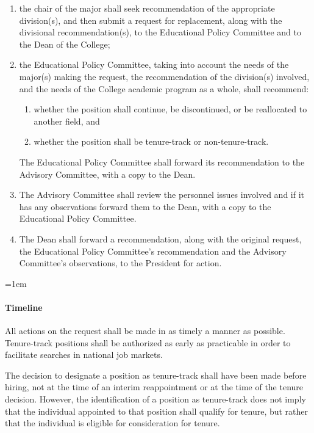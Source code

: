 \documentclass{manual}
\let\oldparagraph\paragraph
\renewcommand\paragraph{\leftskip=1em\oldparagraph}
\newcommand{\itemLevelA}{\alph*.}
\newcommand{\itemLevelB}{\arabic*)}
\newcommand{\itemRefA}{\alph*}
\newcommand{\itemRefB}{\arabic*}
\begin{document}
\begin{enumerate}[label=\itemLevelA,ref=\itemRefA]
\item  the chair of the major shall seek recommendation of the appropriate division(s), and then submit a request for replacement, along with the divisional recommendation(s), to the Educational Policy Committee and to the Dean of the College;

\item  the Educational Policy Committee, taking into account the needs of the major(s) making the request, the recommendation of the division(s) involved, and the needs of the College academic program as a whole, shall recommend:
\begin{enumerate}[label=\itemLevelB,ref=\itemRefB]

\item whether the position shall continue, be discontinued, or be reallocated to another field, and

\item whether the position shall be tenure-track or non-tenure-track.
\end{enumerate}
The Educational Policy Committee shall forward its recommendation to the Advisory Committee, with a copy to the Dean.

\item The Advisory Committee shall review the personnel issues involved and if it has any observations forward them to the Dean, with a copy to the Educational Policy Committee.

\item The Dean shall forward a recommendation, along with the original request, the Educational Policy Committee's recommendation and the Advisory Committee's observations, to the President for action.
\end{enumerate}

\paragraph{Timeline} 
All actions on the request shall be made in as timely a manner as possible. Tenure-track positions shall be authorized as early as practicable in order to facilitate searches in national job markets.

The decision to designate a position as tenure-track shall have been made before hiring, not at the time of an interim reappointment or at the time of the tenure decision. However, the identification of a position as tenure-track does not imply that the individual appointed to that position shall qualify for tenure, but rather that the individual is eligible for consideration for tenure.
\end{document}
